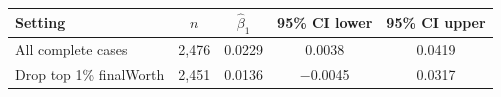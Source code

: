 \begin{tabular}{lcccc}
\toprule
Setting & $n$ & $\hat\beta_1$ & 95\% CI lower & 95\% CI upper \\
\midrule
All complete cases & 2{,}476 & 0.0229 & 0.0038 & 0.0419 \\
Drop top 1\% finalWorth & 2{,}451 & 0.0136 & $-$0.0045 & 0.0317 \\
\bottomrule
\end{tabular}